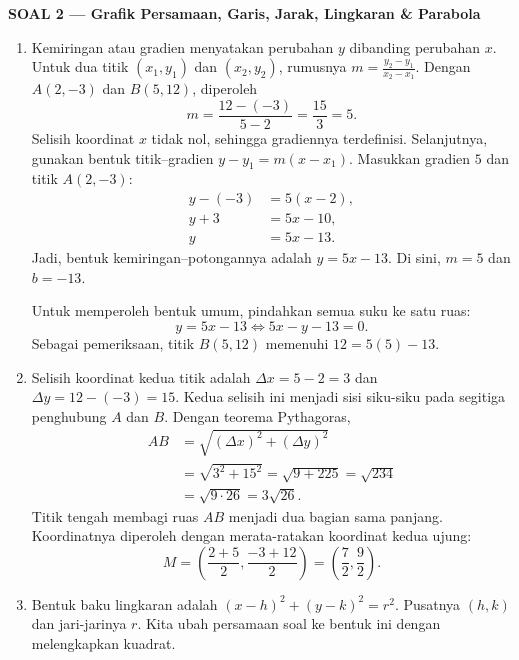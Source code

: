 \documentclass[11pt,a4paper]{article}
\newcommand{\judulsolusi}[2]{%
  \par\bigskip\textbf{SOAL #1 --- #2}\par\smallskip}
\begin{document}
\newpage
\judulsolusi{2}{Grafik Persamaan, Garis, Jarak, Lingkaran \& Parabola}
\begin{enumerate}
  \item Kemiringan atau gradien menyatakan perubahan $y$ dibanding perubahan $x$.
        Untuk dua titik $(x_1,y_1)$ dan $(x_2,y_2)$, rumusnya
        $m=\frac{y_2-y_1}{x_2-x_1}$.
        Dengan $A(2,-3)$ dan $B(5,12)$, diperoleh
        \[
          m=\frac{12-(-3)}{5-2}=\frac{15}{3}=\boxed{5}.
        \]
        Selisih koordinat $x$ tidak nol, sehingga gradiennya terdefinisi.
        Selanjutnya, gunakan bentuk titik--gradien $y-y_1=m(x-x_1)$.
        Masukkan gradien $5$ dan titik $A(2,-3)$:
        \begin{align*}
          y-(-3) & =5(x-2), \\
          y+3    & =5x-10,  \\
          y      & =5x-13.
        \end{align*}
        Jadi, bentuk kemiringan--potongannya adalah $\boxed{y=5x-13}$.
        Di sini, $m=5$ dan $b=-13$.

        Untuk memperoleh bentuk umum, pindahkan semua suku ke satu ruas:
        \[
          y=5x-13\iff\boxed{5x-y-13=0}.
        \]
        Sebagai pemeriksaan, titik $B(5,12)$ memenuhi $12=5(5)-13$.

  \item Selisih koordinat kedua titik adalah $\Delta x=5-2=3$ dan
        $\Delta y=12-(-3)=15$.
        Kedua selisih ini menjadi sisi siku-siku pada segitiga penghubung $A$ dan $B$.
        Dengan teorema Pythagoras,
        \begin{align*}
          AB & =\sqrt{(\Delta x)^2+(\Delta y)^2}        \\
             & =\sqrt{3^2+15^2}=\sqrt{9+225}=\sqrt{234} \\
             & =\sqrt{9\cdot26}=\boxed{3\sqrt{26}}.
        \end{align*}
        Titik tengah membagi ruas $AB$ menjadi dua bagian sama panjang.
        Koordinatnya diperoleh dengan merata-ratakan koordinat kedua ujung:
        \[
          M=\left(\frac{2+5}{2},\frac{-3+12}{2}\right)
          =\boxed{\left(\frac72,\frac92\right)}.
        \]

        \newpage
  \item Bentuk baku lingkaran adalah $(x-h)^2+(y-k)^2=r^2$.
        Pusatnya $(h,k)$ dan jari-jarinya $r$.
        Kita ubah persamaan soal ke bentuk ini dengan melengkapkan kuadrat.


\end{enumerate}
\end{document}
